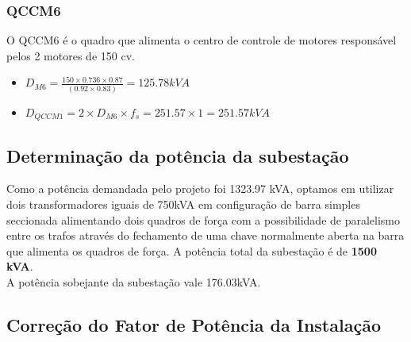 \subsubsection{QCCM6}
O QCCM6 é o quadro que alimenta o centro de controle de motores responsável pelos 2 motores de 150 cv.
\begin{itemize}
\item $D_{M6}=  \frac{150\times0.736\times0.87}{(0.92\times0.83)}= 125.78kVA$
\item $D_{QCCM1} = 2\times D_{M6}\times f_s = 251.57\times1 = 251.57kVA$
\end{itemize}


\subsection{Determinação da potência da subestação}
Como a potência demandada pelo projeto foi 1323.97 kVA, optamos em utilizar dois transformadores iguais de 750kVA em configuração de barra simples seccionada alimentando dois quadros de força com a possibilidade de paralelismo entre os trafos através do fechamento de uma chave normalmente aberta na barra que alimenta os quadros de força. A potência total da subestação é de \textbf{1500 kVA}.\\
A potência sobejante da subestação vale 176.03kVA.

\subsection{Correção do Fator de Potência da Instalação}

